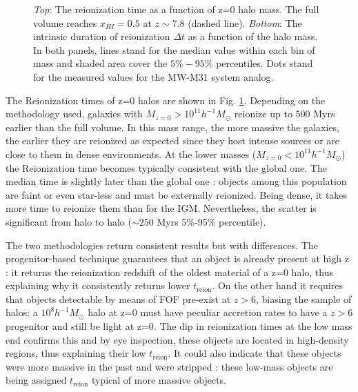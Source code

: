 \documentclass[twocolumn]{aastex61}
\begin{document}
\begin{figure}[ht]
\caption{\textit{Top}: The reionization time as a function of z=0 halo mass.
The full volume reaches $x_{HI}=0.5$ at $z\sim 7.8$ (dashed line). %
 \textit{Bottom}: The intrinsic duration of reionization  $\Delta t$ as a function of the halo mass. In both panels, lines stand for the median value within each bin of mass and  shaded area cover the $5\%-95\%$ percentiles. Dots stand for the measured values for the MW-M31 system analog.}
\label{fig:treion}
\end{figure}

The Reionization times of z=0 halos are shown in Fig. \ref{fig:treion}. Depending on the methodology used, galaxies with $M_{z=0}>10^{11} h^{-1}M_\odot$ reionize up to $500$ Myrs earlier than the full volume. In this mass range, the more massive the galaxies, the earlier they are reionized as expected since they host intense sources or are close to them in dense environments. At the lower masses ($M_{z=0}<10^{11} h^{-1}M_\odot$) the Reionization time becomes typically consistent with the global one.  The median time is slightly later than the global one : objects among this population are faint or even star-less and must be externally reionized. Being dense, it takes more time to reionize them than for the IGM.  Nevertheless, the scatter is significant from halo to halo ($\sim 250$ Myrs 5\%-95\% percentile).

The two methodologies return consistent results but with differences. The progenitor-based technique guarantees that an object is already present at high z : it returns the reionization redshift of the oldest material of a z=0 halo, thus explaining why it consistently returns lower $t_\mathrm{reion}$. On the other hand it requires that objects detectable by means of FOF pre-exist at $z>6$, biasing the sample of halos:  a $10^8 h^{-1} M_\odot$ halo at z=0  must have peculiar accretion rates to have a $z>6$ progenitor and still be light at z=0. The dip in reionization times at the low mass end confirms this and  by eye inspection, these objects are located in high-density regions, thus explaining their low $t_\mathrm{reion}$. It could also indicate that these objects were more massive in the past and were stripped : these low-mass objects are being assigned $t_\mathrm{reion}$ typical of more massive objects.
\end{document}
